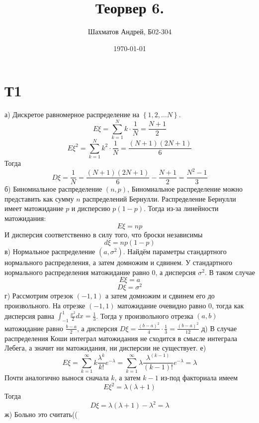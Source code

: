 \documentclass[12pt]{article}
\title{Теорвер 6.}
\author{Шахматов Андрей, Б02-304}
\date{\today}
\begin{document}
\maketitle
\tableofcontents

\section{Т1}
а) Дискретое равномерное распределение на $\left\{ 1, 2, \dots N \right\} $. 
\[
    E \xi = \sum_{k=1}^{N} k \cdot \frac{1}{N} = \frac{N+1}{2} 
\] 
\[
    E \xi^2 = \sum_{k=1}^{N} k^2 \cdot \frac{1}{N} = \frac{(N + 1)(2N + 1)}{6}
\]
Тогда 
\[
    D \xi = \frac{1}{N} = \frac{(N + 1)(2N + 1)}{6} - \frac{N+1}{2} = \frac{N^2 - 1}{3}
\]
б) Биномиальное распределение $(n, p)$, Биномиальное распределение
можно представить как сумму $n$ распределений Бернулли. 
Распределение Бернулли имеет матожидание $p$ и дисперсию $p(1-p)$. 
Тогда из-за линейности матожидания: 
\[
    E \xi = np
\]     
И дисперсия соответственно в силу того, что броски независимы
\[
    d \xi = np(1-p)
\] 
в) Нормальное распределение $(a, \sigma^2)$. Найдём параметры 
стандартного нормального распределения, а затем домножим и сдвинем. 
У стандартного нормального распределения матожидание равно $0$, а дисперсия $\sigma^2$. 
В таком случае 
\[
    E \xi = a
\]   
\[
    D \xi = \sigma^2
\]
г) Рассмотрим отрезок $(-1, 1)$ а затем домножим и сдвинем его до 
произвольного. На отрезке $(-1, 1)$ матожидание очевидно равно $0$, 
тогда как дисперсия равна $\int_{-1}^{1} \frac{x^2}{2} dx = \frac{1}{3}$. 
Тогда у произвольного отрезка $(a, b)$ матожидание равно $\frac{b - a}{2}$, 
а дисперсия $D \xi = \frac{(b-a)^2}{4} \cdot \frac{1}{3} = \frac{(b-a)^2}{12}$
д) В случае распределения Коши интеграл матожидания не сходится в смысле интеграла 
Лебега, а значит ни матожидания, ни дисперсии не существует. 
е) 
\[
    E \xi = \sum_{k=1}^{\infty} k \frac{\lambda^k}{k!} e^{-\lambda} = 
    \sum_{k=1}^{\infty} \lambda \frac{\lambda^(k-1)}{(k-1)!} e^{-\lambda} = \lambda 
\]
Почти аналогично вынося сначала $k$, а затем $k-1$ из-под факториала имеем 
\[
    E \xi^2 = \lambda (\lambda + 1)
\]
Тогда 
\[
    D \xi = \lambda (\lambda + 1) - \lambda^2 = \lambda 
\]
ж) Больно это считать((
\end{document}
